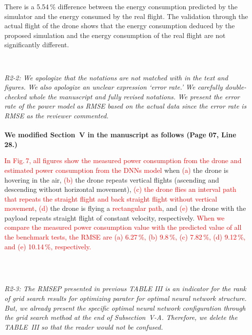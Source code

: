 \documentclass[onecolumn]{IEEEconf}
\begin{document}
\begin{description}
\begin{mdframed}[ linewidth=.75pt, userdefinedwidth=0.9\textwidth]
    There is a 5.54\,\% difference between the energy consumption predicted by the simulator and the energy consumed by the real flight.
    The validation through the actual flight of the drone shows that the energy consumption deduced by the proposed simulation and the energy consumption of the real flight are not significantly different.
        \end{mdframed}
    ~\\	
    \item \textit
    {
    R2-2: We apologize that the notations are not matched with in the text and figures. We also apologize an unclear expression `error rate.' We carefully double-checked whole the manuscript and fully revised notations. We present the error rate of the power model as RMSE based on the actual data since the error rate is RMSE as the reviewer commented.
    }
    ~\\
    ~\\
    \textbf{We modified Section~V in the manuscript as follows (Page 07, Line 28.)}\\
    \begin{mdframed}[ linewidth=.75pt, userdefinedwidth=0.9\textwidth]
    \textcolor{red}{In Fig.\,7, all figures show the measured power consumption from the drone and estimated power consumption from the DNNs model} when \textcolor{red}{(a)} the drone is hovering in the air, \textcolor{red}{(b)} the drone repeats vertical flights (ascending and descending without horizontal movement), \textcolor{red}{(c) the drone flies an interval path that repeats the straight flight and back straight flight without vertical movement}, \textcolor{red}{(d)} the drone is flying a \textcolor{red}{rectangular path}, and \textcolor{red}{(e)} the drone with the payload repeats straight flight of constant velocity, respectively. 
    \textcolor{red}{When we compare the measured power consumption value with the predicted value of all the benchmark tests, the RMSE are (a) 6.27\,\%, (b) 9.8\,\%, (c) 7.82\,\%, (d) 9.12\,\%, and (e) 10.14\,\%, respectively.}
    \end{mdframed}
    ~\\~\\
	\item \textit
	{
	R2-3: The RMSEP presented in previous TABLE III is an indicator for the rank of grid search results for optimizing parater for optimal neural network structure. But, we already present the specific optimal neural network configuration through the grid search method at the end of Subsection~V-A. Therefore, we delete the TABLE~III so that the reader would not be confused. 
}
\end{description}
\end{document}
